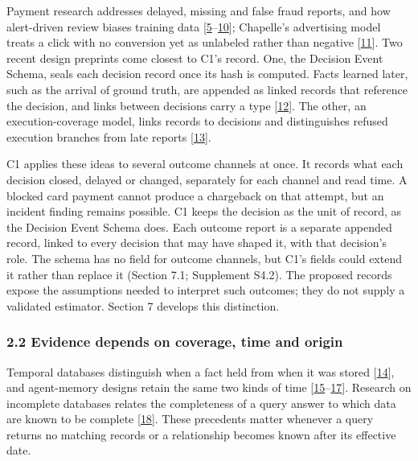 \documentclass[
  11pt,
]{article}
\begin{document}
Payment research addresses delayed, missing and false fraud reports, and
how alert-driven review biases training data
{[}\protect\hyperlink{ref-Cao2019TitAnt}{5}--\protect\hyperlink{ref-HeLoh2026Grab}{10}{]};
Chapelle's advertising model treats a click with no conversion yet as
unlabeled rather than negative
{[}\protect\hyperlink{ref-Chapelle2014Delayed}{11}{]}. Two recent design
preprints come closest to C1's record. One, the Decision Event Schema,
seals each decision record once its hash is computed. Facts learned
later, such as the arrival of ground truth, are appended as linked
records that reference the decision, and links between decisions carry a
type {[}\protect\hyperlink{ref-Solozobov2026DecisionTrace}{12}{]}. The
other, an execution-coverage model, links records to decisions and
distinguishes refused execution branches from late reports
{[}\protect\hyperlink{ref-Wu2026EvidenceCoverage}{13}{]}.

C1 applies these ideas to several outcome channels at once. It records
what each decision closed, delayed or changed, separately for each
channel and read time. A blocked card payment cannot produce a
chargeback on that attempt, but an incident finding remains possible. C1
keeps the decision as the unit of record, as the Decision Event Schema
does. Each outcome report is a separate appended record, linked to every
decision that may have shaped it, with that decision's role. The schema
has no field for outcome channels, but C1's fields could extend it
rather than replace it (Section 7.1; Supplement S4.2). The proposed
records expose the assumptions needed to interpret such outcomes; they
do not supply a validated estimator. Section 7 develops this
distinction.

\hypertarget{evidence-depends-on-coverage-time-and-origin}{%
\subsubsection{2.2 Evidence depends on coverage, time and
origin}\label{evidence-depends-on-coverage-time-and-origin}}

Temporal databases distinguish when a fact held from when it was stored
{[}\protect\hyperlink{ref-Snodgrass1986Temporal}{14}{]}, and
agent-memory designs retain the same two kinds of time
{[}\protect\hyperlink{ref-Wang2026TOKI}{15}--\protect\hyperlink{ref-Dan2026Anamnesis}{17}{]}.
Research on incomplete databases relates the completeness of a query
answer to which data are known to be complete
{[}\protect\hyperlink{ref-Razniewski2011Completeness}{18}{]}. These
precedents matter whenever a query returns no matching records or a
relationship becomes known after its effective date.
\end{document}
